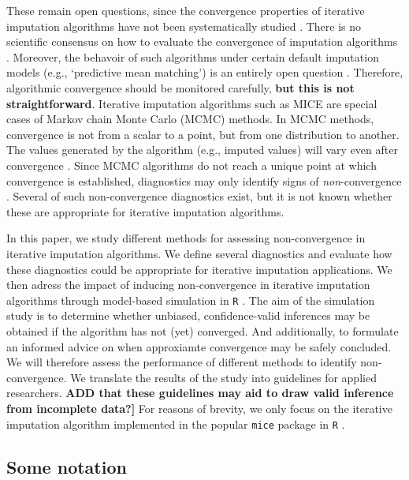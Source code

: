 \documentclass[Royal,times,sageh]{sagej}
\begin{document}
These remain open questions, since the convergence properties of iterative imputation algorithms have not been systematically studied \citep{buur18}. There is no scientific consensus on how to evaluate the convergence of imputation algorithms \citep{taka17}. Moreover, the behavoir of such algorithms under certain default imputation models (e.g., `predictive mean matching') is an entirely open question \citep{murr18}. Therefore, algorithmic convergence should be monitored carefully, \textbf{but this is not straightforward}. Iterative imputation algorithms such as MICE are special cases of Markov chain Monte Carlo (MCMC) methods. In MCMC methods, convergence is not from a scalar to a point, but from one distribution to another. The values generated by the algorithm (e.g., imputed values) will vary even after convergence \citep{gelm13}. Since MCMC algorithms do not reach a unique point at which convergence is established, diagnostics may only identify signs of \emph{non}-convergence \citep{hoff09}. Several of such non-convergence diagnostics exist, but it is not known whether these are appropriate for iterative imputation algorithms.

In this paper, we study different methods for assessing non-convergence in iterative imputation algorithms. We define several diagnostics and evaluate how these diagnostics could be appropriate for iterative imputation applications. We then adress the impact of inducing non-convergence in iterative imputation algorithms through model-based simulation in \texttt{R} \citep{R}. The aim of the simulation study is to determine whether unbiased, confidence-valid inferences may be obtained if the algorithm has not (yet) converged. And additionally, to formulate an informed advice on when approxiamte convergence may be safely concluded. We will therefore assess the performance of different methods to identify non-convergence. We translate the results of the study into guidelines for applied researchers. \textbf{ADD that these guidelines may aid to draw valid inference from incomplete data?{]}} For reasons of brevity, we only focus on the iterative imputation algorithm implemented in the popular \texttt{mice} package \citep{mice} in \texttt{R} \citep{R}.

\hypertarget{some-notation}{%
\subsection{Some notation}\label{some-notation}}
\end{document}
